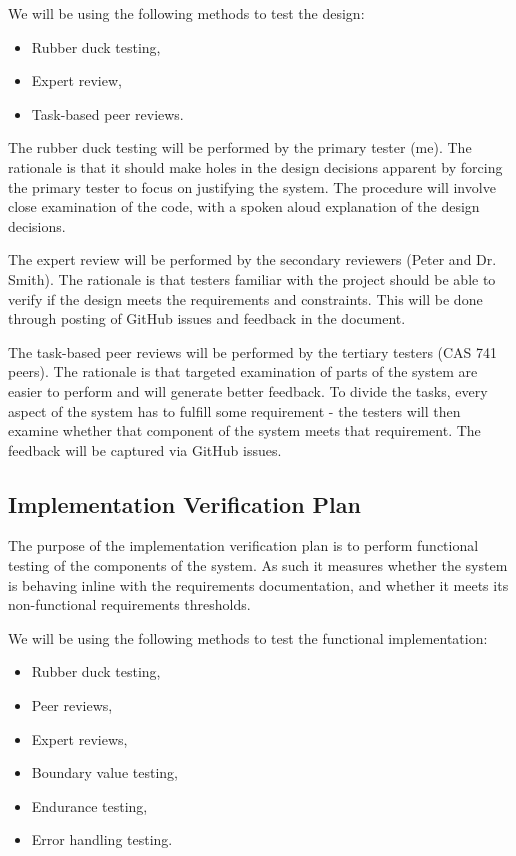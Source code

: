 \documentclass[12pt, titlepage]{article}
\begin{document}
We will be using the following methods to test the design:

\begin{itemize}
	\item Rubber duck testing,
	\item Expert review,
	\item Task-based peer reviews.
\end{itemize}

The rubber duck testing will be performed by the primary tester (me). The 
rationale is that it should make holes in the design decisions apparent by 
forcing the primary tester to focus on justifying the system. The procedure 
will involve close examination of the code, with a spoken aloud explanation of 
the design decisions.

The expert review will be performed by the secondary reviewers (Peter and Dr. 
Smith). The rationale is that testers familiar with the project should be able 
to verify if the design meets the requirements and constraints. This will be 
done through posting of GitHub issues and feedback in the document.

The task-based peer reviews will be performed by the tertiary testers (CAS 741 
peers). The rationale is that targeted examination of parts of the system are 
easier to perform and will generate better feedback. To divide the tasks, every 
aspect of the system has to fulfill some requirement - the testers will then 
examine whether that component of the system meets that requirement. The 
feedback will be captured via GitHub issues.

\subsection{Implementation Verification Plan}
The purpose of the implementation verification plan is to perform functional 
testing of the components of the system. As such it measures whether the system 
is behaving inline with the requirements documentation, and whether it meets 
its non-functional requirements thresholds.

We will be using the following methods to test the functional implementation:

\begin{itemize}
	\item Rubber duck testing,
	\item Peer reviews,
	\item Expert reviews,
	\item Boundary value testing,
	\item Endurance testing,
	\item Error handling testing.
\end{itemize}
\end{document}

